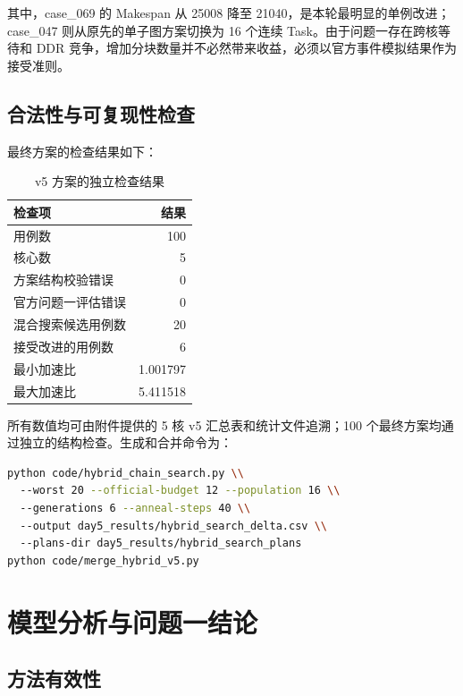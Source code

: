 其中，case\_069 的 Makespan 从 25008 降至 21040，是本轮最明显的单例改进；case\_047 则从原先的单子图方案切换为 16 个连续 Task。由于问题一存在跨核等待和 DDR 竞争，增加分块数量并不必然带来收益，必须以官方事件模拟结果作为接受准则。

\subsection{合法性与可复现性检查}

最终方案的检查结果如下：
\begin{table}[htbp]
\centering
\caption{v5 方案的独立检查结果}
\label{tab:validation}
\begin{tabular}{lr}
\toprule
检查项 & 结果 \\
\midrule
用例数 & 100 \\
核心数 & 5 \\
方案结构校验错误 & 0 \\
官方问题一评估错误 & 0 \\
混合搜索候选用例数 & 20 \\
接受改进的用例数 & 6 \\
最小加速比 & 1.001797 \\
最大加速比 & 5.411518 \\
\bottomrule
\end{tabular}
\end{table}

所有数值均可由附件提供的 5 核 v5 汇总表和统计文件追溯；100 个最终方案均通过独立的结构检查。生成和合并命令为：
\begin{lstlisting}[language=bash,basicstyle=\scriptsize\ttfamily]
python code/hybrid_chain_search.py \\
  --worst 20 --official-budget 12 --population 16 \\
  --generations 6 --anneal-steps 40 \\
  --output day5_results/hybrid_search_delta.csv \\
  --plans-dir day5_results/hybrid_search_plans
python code/merge_hybrid_v5.py
\end{lstlisting}

\section{模型分析与问题一结论}

\subsection{方法有效性}

